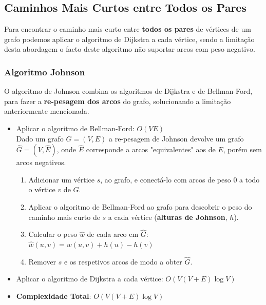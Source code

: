 \documentclass[11pt]{article}
\begin{document}
\newpage

\subsection{Caminhos Mais Curtos entre Todos os Pares} 

Para encontrar o caminho mais curto entre \textbf{todos os pares} de vértices de um grafo podemos aplicar o algoritmo de Dijkstra a cada vértice, sendo a limitação desta abordagem o facto deste algoritmo não suportar arcos com peso negativo.

\subsubsection{Algoritmo Johnson}

O algoritmo de Johnson combina os algoritmos de Dijkstra e de Bellman-Ford, para fazer a \textbf{re-pesagem dos arcos} do grafo, solucionando a limitação anteriormente mencionada.

\begin{itemize}[topsep=0pt]
    \item Aplicar o algoritmo de Bellman-Ford: $O(VE)$ \\[6pt]
          Dado um grafo $G=(V,E)$ a re-pesagem de Johnson devolve um grafo $\hat{G}=(V,\hat{E})$, onde $\hat{E}$ corresponde a arcos "equivalentes" aos de $E$, porém sem arcos negativos.
          \begin{enumerate}
              \item Adicionar um vértice $s$, ao grafo, e conectá-lo com arcos de peso 0 a todo o vértice $v$ de $G$.
              \item Aplicar o algoritmo de Bellman-Ford ao grafo para descobrir o peso do caminho mais curto de $s$ a cada vértice (\textbf{alturas de Johnson}, $h$).
              \item Calcular o peso $\hat{w}$ de cada arco em $\hat{G}$:\ \
                    $\hat{w}(u,v) = w(u,v)+h(u)-h(v)$
              \item Remover $s$ e os respetivos arcos de modo a obter $\hat{G}$.
          \end{enumerate}
    \item Aplicar o algoritmo de Dijkstra a cada vértice: $O(V(V+E)\log V)$
    \item \textbf{Complexidade Total}: $O(V(V+E)\log V)$
\end{itemize}

\newpage
\end{document}
